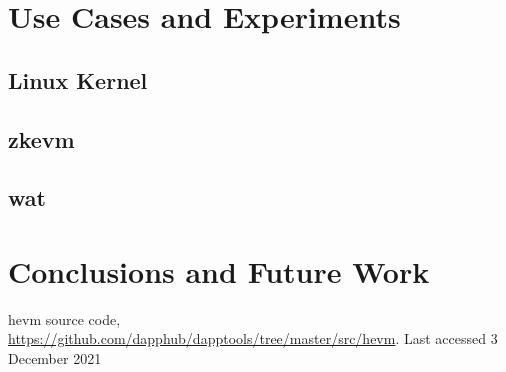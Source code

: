 \documentclass[runningheads]{llncs}
\begin{document}
\section{Use Cases and Experiments}

\subsection{Linux Kernel}

\subsection{zkevm}

\subsection{wat}

\section{Conclusions and Future Work}

%
%
%
% 
% 
%
\begin{thebibliography}{1}
hevm source code, \url{https://github.com/dapphub/dapptools/tree/master/src/hevm}.
Last accessed 3 December 2021
\end{thebibliography}
\end{document}
